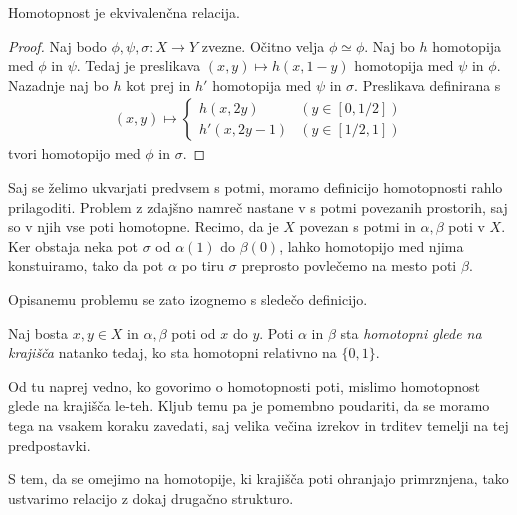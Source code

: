 \documentclass[11pt, a4paper]{article}
\begin{document}
\begin{trditev}
    Homotopnost je ekvivalenčna relacija.
    \label{homotopnost-ekvivalencna-relacija}
\end{trditev}


\begin{proof}
    Naj bodo $\phi, \psi, \sigma : X \to Y$ zvezne. Očitno velja $\phi \simeq \phi$. Naj bo $h$ homotopija med $\phi$ in $\psi$. Tedaj je preslikava $(x, y) \mapsto h(x, 1 - y)$ homotopija med $\psi$ in $\phi$. Nazadnje naj bo $h$ kot prej in $h'$ homotopija med $\psi$ in $\sigma$. Preslikava definirana s
    \begin{align*}
        (x, y) \mapsto
        \begin{cases}
            h(x, 2y) & (y \in [0, 1/2]) \\
            h'(x, 2y - 1) & (y \in [1/2, 1])
        \end{cases}
    \end{align*}
    tvori homotopijo med $\phi$ in $\sigma$.
\end{proof}


Saj se želimo ukvarjati predvsem s potmi, moramo definicijo homotopnosti rahlo prilagoditi. Problem z zdajšno namreč nastane v s potmi povezanih prostorih, saj so v njih vse poti homotopne. Recimo, da je $X$ povezan s potmi in $\alpha, \beta$ poti v $X$. Ker obstaja neka pot $\sigma$ od $\alpha(1)$ do $\beta(0)$, lahko homotopijo med njima konstuiramo, tako da pot $\alpha$ po tiru $\sigma$ preprosto povlečemo na mesto poti $\beta$.

Opisanemu problemu se zato izognemo s sledečo definicijo.


\begin{definicija}
    Naj bosta $x, y \in X$ in $\alpha, \beta$ poti od $x$ do $y$. Poti $\alpha$ in $\beta$ sta \textit{homotopni glede na krajišča} natanko tedaj, ko sta homotopni relativno na $\{0, 1\}$.
\end{definicija}


\begin{opomba}
    Od tu naprej vedno, ko govorimo o homotopnosti poti, mislimo homotopnost glede na krajišča le-teh. Kljub temu pa je pomembno poudariti, da se moramo tega na vsakem koraku zavedati, saj velika večina izrekov in trditev temelji na tej predpostavki.
\end{opomba}


S tem, da se omejimo na homotopije, ki krajišča poti ohranjajo primrznjena, tako ustvarimo relacijo z dokaj drugačno strukturo.
\end{document}
